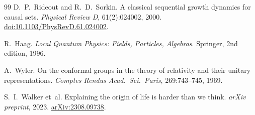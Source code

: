 \documentclass[11pt,a4paper]{article}
\begin{document}
\begin{thebibliography}{99}
D.~P.~Rideout and R.~D.~Sorkin.
\newblock A classical sequential growth dynamics for causal sets.
\newblock \emph{Physical Review D}, 61(2):024002, 2000.
\newblock \href{https://doi.org/10.1103/PhysRevD.61.024002}%
  {doi:10.1103/PhysRevD.61.024002}.

R.~Haag.
\newblock \emph{Local Quantum Physics: Fields, Particles, Algebras}.
\newblock Springer, 2nd edition, 1996.

A.~Wyler.
\newblock On the conformal groups in the theory of relativity and their
  unitary representations.
\newblock \emph{Comptes Rendus Acad.~Sci.~Paris}, 269:743--745, 1969.

S.~I.~Walker et~al.
\newblock Explaining the origin of life is harder than we think.
\newblock \emph{arXiv preprint}, 2023.
\newblock \href{https://arxiv.org/abs/2308.09738}{arXiv:2308.09738}.

\end{thebibliography}
\end{document}
